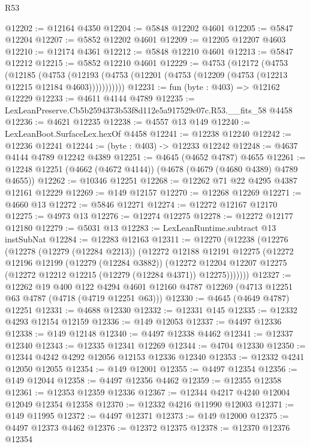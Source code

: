 \begin{lexlean}{R53}
\begin{coremodule}
@12202 := @12164 @4350
@12204 := @5848 @12202 @4601
@12205 := @5847 @12204
@12207 := @5852 @12202 @4601
@12209 := @12205 @12207 @4603
@12210 := @12174 @4361
@12212 := @5848 @12210 @4601
@12213 := @5847 @12212
@12215 := @5852 @12210 @4601
@12229 := @4753
    (@12172
      (@4753
        (@12185
          (@4753 (@12193 (@4753 (@12201 (@4753 (@12209 (@4753 (@12213 @12215 @12184 @4603)))))))))))
@12231 := fun (byte : @403) => @12162 @12229
@12233 := @4611 @4144 @4789
@12235 := LexLeanPreserve.Cb5b2594373b53f8d112e5a917529c07c.R53.__fits_58 @4458
@12236 := @4621 @12235
@12238 := @4557 @13 @149
@12240 := LexLeanBoot.SurfaceLex.hexOf @4458
@12241 := @12238 @12240
@12242 := @12236 @12241
@12244 := (byte : @403) -> @12233 @12242
@12248 := @4637 @4144 @4789 @12242 @4389
@12251 := @4645 (@4652 @4787) @4655
@12261 := @12248 @12251 (@4662 (@4672 @4144)) (@4678 (@4679 (@4680 @4389) @4789 @4655))
@12262 := @10346 @12251
@12268 := @12262 @71 @22 @4295 @4387 @12161 @12229
@12269 := @149 @12157
@12270 := @12268 @12269
@12271 := @4660 @13
@12272 := @5846 @12271
@12274 := @12272 @12167 @12170
@12275 := @4973 @13
@12276 := @12274 @12275
@12278 := @12272 @12177 @12180
@12279 := @5031 @13
@12283 := LexLeanRuntime.subtract @13 instSubNat
@12284 := @12283 @12163
@12311 := @12270
    (@12238
      (@12276
        (@12278
          (@12279 (@12284 @2213))
          (@12272
            @12188
            @12191
            @12275
            (@12272
              @12196
              @12199
              (@12279 (@12284 @3882))
              (@12272
                @12204
                @12207
                @12275
                (@12272 @12212 @12215 (@12279 (@12284 @4371)) @12275)))))))
@12327 := @12262
    @19
    @400
    @122
    @4294
    @4601
    @12160
    @4787
    @12269
    (@4713 @12251 @63 @4787 (@4718 (@4719 @12251 @63)))
@12330 := @4645 (@4649 @4787) @12251
@12331 := @4688 @12330
@12332 := @12331 @145
@12335 := @12332 @4293 @12154 @12159
@12336 := @149 @12053
@12337 := @4497 @12336
@12338 := @149 @12148
@12340 := @4497 @12338 @4462
@12341 := @12337 @12340
@12343 := @12335 @12341 @12269
@12344 := @4704 @12330
@12350 := @12344 @4242 @4292 @12056 @12153 @12336 @12340
@12353 := @12332 @4241 @12050 @12055
@12354 := @149 @12001
@12355 := @4497 @12354
@12356 := @149 @12044
@12358 := @4497 @12356 @4462
@12359 := @12355 @12358
@12361 := @12353 @12359 @12336
@12367 := @12344 @4217 @4240 @12004 @12049 @12354 @12358
@12370 := @12332 @4216 @11990 @12003
@12371 := @149 @11995
@12372 := @4497 @12371
@12373 := @149 @12000
@12375 := @4497 @12373 @4462
@12376 := @12372 @12375
@12378 := @12370 @12376 @12354

\end{coremodule}
\end{lexlean}
